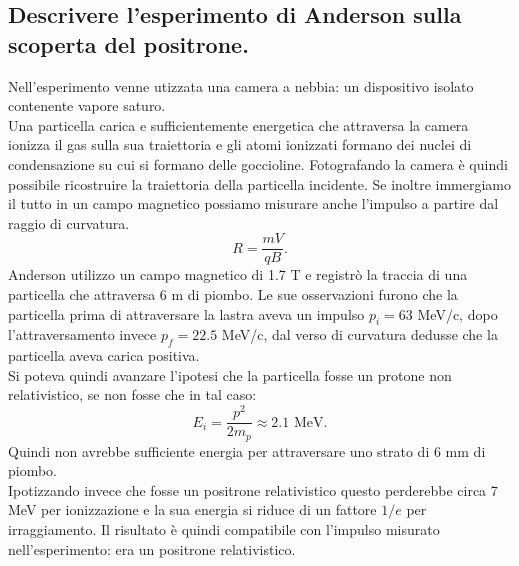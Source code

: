 \subsection[\hspace{1mm} ]{Descrivere l’esperimento di Anderson sulla scoperta del positrone.
}\label{sec:4.a.34}
Nell'esperimento venne utizzata una camera a nebbia: un dispositivo isolato contenente vapore saturo. \\ 
Una particella carica e sufficientemente energetica che attraversa la camera ionizza il gas sulla sua traiettoria e gli atomi ionizzati formano dei nuclei di condensazione su cui si formano delle goccioline. Fotografando la camera è quindi possibile ricostruire la traiettoria della particella incidente. Se inoltre immergiamo il tutto in un campo magnetico possiamo misurare anche l'impulso a partire dal raggio di curvatura.
\[
	R = \frac{mV}{qB}
.\] 
Anderson utilizzo un campo magnetico di 1.7 T e registrò la traccia di una particella che attraversa 6 m di piombo. Le sue osservazioni furono che la particella prima di attraversare la lastra aveva un impulso $p_{i}=63$ MeV/c, dopo l'attraversamento invece $p_{f}=22.5$ MeV/c, dal verso di curvatura dedusse che la particella aveva carica positiva.\\
Si poteva quindi avanzare l'ipotesi che la particella fosse un protone non relativistico, se non fosse che in tal caso:
\[
	E_{i}= \frac{p^2}{2m_{p}}\approx 2.1 \text{ MeV}
.\] 
Quindi non avrebbe sufficiente energia per attraversare uno strato di 6 mm di piombo.\\
Ipotizzando invece che fosse un positrone relativistico questo perderebbe circa 7 MeV per ionizzazione e la sua energia si riduce di un fattore $1 /e$ per irraggiamento. Il risultato è quindi compatibile con l'impulso misurato nell'esperimento: era un positrone relativistico.

